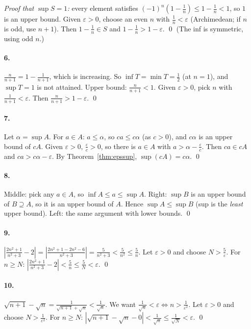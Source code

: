 \documentclass[11pt]{article}
\theoremstyle{definition}
\newcommand{\eps}{\varepsilon}
\begin{document}
\emph{Proof that $\sup S=1$:} every element satisfies
$(-1)^n(1-\frac1n)\le1-\frac1n<1$, so $1$ is an upper bound. Given
$\eps>0$, choose an even $n$ with $\frac1n<\eps$ (Archimedean; if $n$ is
odd, use $n+1$). Then $1-\frac1n\in S$ and $1-\frac1n>1-\eps$. \qed
(The inf is symmetric, using odd $n$.)

\paragraph{6.} $\frac{n}{n+1}=1-\frac1{n+1}$, which is increasing. So
$\inf T=\min T=\frac12$ (at $n=1$), and $\sup T=1$ is not attained.
Upper bound: $\frac n{n+1}<1$. Given $\eps>0$, pick $n$ with
$\frac1{n+1}<\eps$. Then $\frac{n}{n+1}>1-\eps$. \qed

\paragraph{7.} Let $\alpha=\sup A$. For $a\in A$: $a\le\alpha$, so
$ca\le c\alpha$ (as $c>0$), and $c\alpha$ is an upper bound of $cA$. Given
$\eps>0$, $\frac\eps c>0$, so there is $a\in A$ with $a>\alpha-\frac\eps c$.
Then $ca\in cA$ and $ca>c\alpha-\eps$. By Theorem~\ref{thm:epssup},
$\sup(cA)=c\alpha$. \qed

\paragraph{8.} Middle: pick any $a\in A$, so $\inf A\le a\le\sup A$.
Right: $\sup B$ is an upper bound of $B\supseteq A$, so it is an upper bound
of $A$. Hence $\sup A\le\sup B$ (sup is the \emph{least} upper bound).
Left: the same argument with lower bounds. \qed

\paragraph{9.}
$\left|\frac{2n^2+1}{n^2+3}-2\right|=\left|\frac{2n^2+1-2n^2-6}{n^2+3}\right|=\frac5{n^2+3}<\frac5{n^2}\le\frac5n$.
Let $\eps>0$ and choose $N>\frac5\eps$. For $n\ge N$:
$\left|\frac{2n^2+1}{n^2+3}-2\right|<\frac5n\le\frac5N<\eps$. \qed

\paragraph{10.}
$\sqrt{n+1}-\sqrt n=\frac{1}{\sqrt{n+1}+\sqrt n}<\frac1{\sqrt n}$. We want
$\frac1{\sqrt n}<\eps\iff n>\frac1{\eps^2}$. Let $\eps>0$ and choose
$N>\frac1{\eps^2}$. For $n\ge N$:
$|\sqrt{n+1}-\sqrt n-0|<\frac1{\sqrt n}\le\frac1{\sqrt N}<\eps$. \qed
\end{document}
